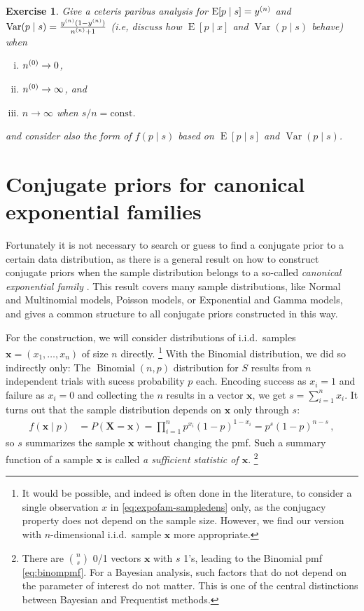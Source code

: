 \documentclass[12pt,a4paper	,twoside]{article}
\newcommand{\bs}[1]{\boldsymbol{#1}}
\renewcommand{\vec}[1]{{\bs#1}}
\newcommand{\E}{\operatorname{E}}
\newcommand{\V}{\operatorname{Var}}
\newcommand{\bin}{\operatorname{Binomial}}
\newtheorem{myex}{Exercise}
\begin{document}
\begin{myex}
Give a ceteris paribus analysis for $\E[p\mid s] = \yn$ and $\V(p\mid s) = \frac{\yn (1-\yn)}{\nn + 1}$
(i.e, discuss how $\E[p\mid x]$ and $\V(p\mid s)$ behave) when
\begin{enumerate}[(i)]
\item $n^{(0)} \to 0$,
\item $n^{(0)} \to \infty$, and
\item $n\to \infty$ when $s/n = \text{const}$.
\end{enumerate}
and consider also the form of $f(p\mid s)$ based on $\E[p\mid s]$ and $\V(p\mid s)$.
\end{myex}


\section{Conjugate priors for canonical exponential families}

Fortunately it is not necessary to search or guess to find a conjugate prior to a certain data distribution,
as there is a general result on how to construct conjugate priors
when the sample distribution belongs to a so-called \emph{canonical exponential family}
\parencite[e.g.,][pp.~202 and 272f]{2000:bernardosmith}. %
This result covers many sample distributions, %
like Normal and Multinomial models, Poisson models, or Exponential and Gamma models,
and gives a common structure to all conjugate priors constructed in this way.

For the construction, we will consider distributions of i.i.d.\ samples $\vec{x} = (x_1,\ldots,x_n)$ of size $n$ directly.%
\footnote{\label{foot:dataisplural}It would be possible, and indeed is often done in the literature,
to consider a single observation $x$ in \eqref{eq:expofam-sampledens} only,
as the conjugacy property does not depend on the sample size.
However, we find our version with $n$-dimensional i.i.d.\ sample $\vec{x}$
more appropriate.} %
With the Binomial distribution, we did so indirectly only:
The $\bin(n,p)$ distribution for $S$ results from $n$ independent trials with sucess probability $p$ each.
Encoding success as $x_i=1$ and failure as $x_i=0$ and collecting the $n$ results in a vector $\vec{x}$,
we get $s =\sum_{i=1}^n x_i$.
It turns out that the sample distribution depends on $\vec{x}$ only through $s$:
\begin{align}
f(\vec{x} \mid p) &= P(\vec{X} = \vec{x}) = \prod_{i=1}^n p^{x_i} (1-p)^{1-x_i} = p^s (1-p)^{n-s}\,,
\end{align}
so $s$ summarizes the sample $\vec{x}$ without changing the pmf.
Such a summary function of a sample $\vec{x}$ is called \emph{a sufficient statistic of $\vec{x}$}.%
\footnote{There are $\binom{n}{s}$ 0/1 vectors $\vec{x}$ with $s$ 1's, leading to the Binomial pmf \eqref{eq:binompmf}.
For a Bayesian analysis, such factors that do not depend on the parameter of interest do not matter.
This is one of the central distinctions between Bayesian and Frequentist methods.}
\end{document}
